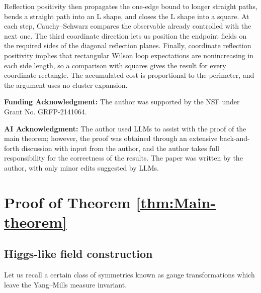 \documentclass[reqno]{amsart}
\begin{document}
Reflection positivity then propagates the one-edge bound to longer
straight paths, bends a straight path into an L shape, and closes the
L shape into a square. At each step, Cauchy--Schwarz compares the
observable already controlled with the next one. The third coordinate
direction lets us position the endpoint fields on the required sides
of the diagonal reflection planes. Finally, coordinate reflection
positivity implies that rectangular Wilson loop expectations are
nonincreasing in each side length, so a comparison with squares gives
the result for every coordinate rectangle. The accumulated cost is
proportional to the perimeter, and the argument uses no cluster
expansion.

\noindent \textbf{Funding Acknowledgment:} The author was supported by the NSF under Grant No. GRFP-2141064.

\noindent \textbf{AI Acknowledgment:} The author used LLMs to assist with the proof of the main theorem; however, the proof was obtained through an extensive back-and-forth discussion with input from the author, and the author takes full responsibility for the correctness of the results. The paper was written by the author, with only minor edits suggested by LLMs.

\section{Proof of Theorem \ref{thm:Main-theorem}}\label{Section:Proof-of-main-thm}

\subsection{Higgs-like field construction}\label{sec:field-construction}

 Let us recall a certain class of symmetries known as gauge transformations which leave the Yang--Mills measure invariant.
\end{document}
